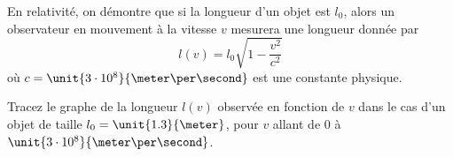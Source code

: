 \begin{exercice}\label{exoMatlab0016}

	En relativité, on démontre que si la longueur d'un objet est $l_0$, alors un observateur en mouvement à la vitesse $v$ mesurera une longueur donnée par
	\begin{equation}
		l(v)=l_0\sqrt{1-\frac{ v^2 }{ c^2 }}
	\end{equation}
	où $c=\unit{3\cdot 10^8}{\meter\per\second}$ est une constante physique.

	Tracez le graphe de la longueur $l(v)$ observée en fonction de $v$ dans le cas d'un objet de taille $l_0=\unit{1.3}{\meter}$, pour $v$ allant de $0$ à $\unit{3\cdot 10^8}{\meter\per\second}$.

\end{exercice}
